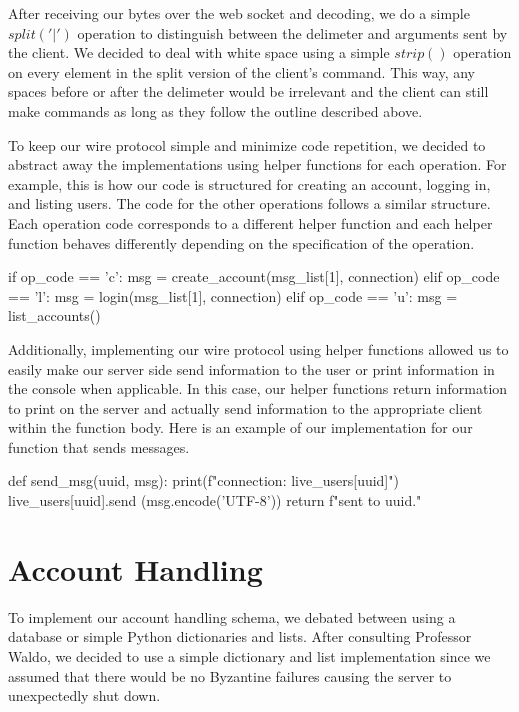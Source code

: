 \documentclass[
	a4paper, %
	10pt, %
	unnumberedsections, %
	twoside, %
]{LTJournalArticle}
\begin{document}
After receiving our bytes over the web socket and decoding, we do a simple 
$split('|')$ operation to distinguish between the delimeter and arguments sent by the client. We decided to deal with white space using a simple $strip()$ operation on every element in the split version of the client's command. This way, any spaces before or after the delimeter would be irrelevant and the client can still make commands as long as they follow the outline described above. 

To keep our wire protocol simple and minimize code repetition, we decided to abstract away the implementations using helper functions for each operation. For example, this is how our code is structured for creating an account, logging in, and listing users. The code for the other operations follows a similar structure. Each operation code corresponds to a different helper function and each helper function behaves differently depending on the specification of the operation.

\begin{python}
    if op_code == 'c': 
        msg = create_account(msg_list[1], 
        connection)
    elif op_code == 'l':
        msg = login(msg_list[1], connection)
    elif op_code == 'u':
        msg = list_accounts()
\end{python}

Additionally, implementing our wire protocol using helper functions allowed us to easily make our server side send information to the user or print information in the console when applicable. In this case, our helper functions return information to print on the server and actually send information to the appropriate client within the function body. Here is an example of our implementation for our function that sends messages. 

\begin{python}
    def send_msg(uuid, msg):
    print(f"connection: {live_users[uuid]}")
    live_users[uuid].send
    (msg.encode('UTF-8'))
    return f"\nMessage sent to {uuid}.\n"
\end{python}

\section{Account Handling}

To implement our account handling schema, we debated between using a database or simple Python dictionaries and lists. After consulting Professor Waldo, we decided to use a simple dictionary and list implementation since we assumed that there would be no Byzantine failures causing the server to unexpectedly shut down. 
\end{document}
